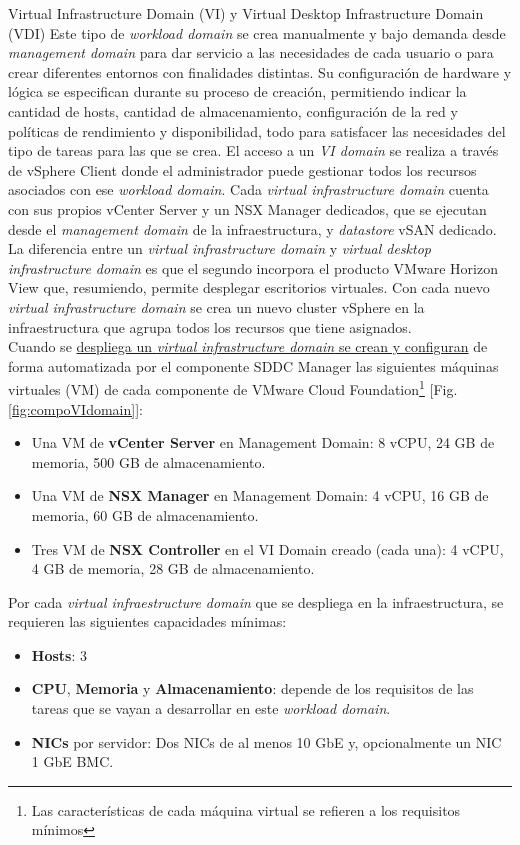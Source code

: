 \begin{subsubsection}{Virtual Infrastructure Domain (VI) y Virtual Desktop Infrastructure Domain (VDI)}
\label{subsubsec:domainVI}
Este tipo de \textit{workload domain} se crea manualmente y bajo demanda desde \textit{management domain} para dar servicio a las necesidades de cada usuario o para crear diferentes entornos con finalidades distintas. Su configuración de hardware y lógica se especifican durante su proceso de creación, permitiendo indicar la cantidad de hosts, cantidad de almacenamiento, configuración de la red y políticas de rendimiento y disponibilidad, todo para satisfacer las necesidades del tipo de tareas para las que se crea. El acceso a un \textit{VI domain} se realiza a través de vSphere Client donde el administrador puede gestionar todos los recursos asociados con ese \textit{workload domain}. Cada \textit{virtual infrastructure domain} cuenta con sus propios vCenter Server y un NSX Manager dedicados, que se ejecutan desde el \textit{management domain} de la infraestructura, y \textit{datastore} vSAN dedicado. La diferencia entre un \textit{virtual infrastructure domain} y \textit{virtual desktop infrastructure domain} es que el segundo incorpora el producto VMware Horizon View que, resumiendo, permite desplegar escritorios virtuales. Con cada nuevo \textit{virtual infrastructure domain} se crea un nuevo cluster vSphere en la infraestructura que agrupa todos los recursos que tiene asignados.\\
Cuando se \underline{despliega un \textit{virtual infrastructure domain} se crean y configuran} de forma automatizada por el componente SDDC Manager las siguientes máquinas virtuales (VM) de cada componente de VMware Cloud Foundation\footnote{Las características de cada máquina virtual se refieren a los requisitos mínimos} \cite{sddcComponents} [Fig. \ref{fig:compoVIdomain}]:
\begin{itemize}
    \item Una VM de \textbf{vCenter Server} en Management Domain: 8 vCPU, 24 GB de memoria, 500 GB de almacenamiento.
    \item Una VM de \textbf{NSX Manager} en Management Domain: 4 vCPU, 16 GB de memoria, 60 GB de almacenamiento.
    \item Tres VM de \textbf{NSX Controller} en el VI Domain creado (cada una):  4 vCPU, 4 GB de memoria, 28 GB de almacenamiento.
\end{itemize}

Por cada \textit{virtual infraestructure domain} que se despliega en la infraestructura, se requieren las siguientes capacidades mínimas\cite{WDminRequierements}:
\begin{itemize}
    \item \textbf{Hosts}: 3
    \item \textbf{CPU}, \textbf{Memoria} y \textbf{Almacenamiento}: depende de los requisitos de las tareas que se vayan a desarrollar en este \textit{workload domain}.
    \item \textbf{NICs} por servidor: Dos NICs de al menos 10 GbE y, opcionalmente un NIC 1 GbE BMC.
\end{itemize}


\end{subsubsection}

